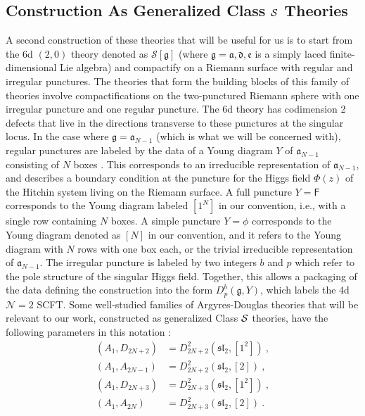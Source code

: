 \documentclass[a4paper,10pt]{article}
\newcommand{\mr}[1]{\mathsf{#1}}
\newcommand{\tsf}[1]{\textsf{#1}}
\newcommand{\mf}[1]{\mathfrak{#1}}
\def\CS {{\cal S}}
\begin{document}
\subsection{Construction As Generalized Class $\CS$ Theories}
A second construction of these theories that will be useful for us is to start from the 6d $(2,0)$ theory denoted as $\mathcal{S}[\mf{g}]$ (where $\mf{g}=\mf{a,d,e}$ is a simply laced finite-dimensional Lie algebra) and compactify on a Riemann surface with regular and irregular punctures. The theories that form the building blocks of this family of theories involve compactifications on the two-punctured Riemann sphere with one irregular puncture and one regular puncture. The 6d theory has codimension 2 defects that live in the directions transverse to these punctures at the singular locus. In the case where $\mf{g}=\mf{a}_{N-1}$ (which is what we will be concerned with), regular punctures are labeled by the data of a Young diagram $Y$ of $\mf{a}_{N-1}$ consisting of $N$ boxes \cite{Gaiotto:2009we,Chacaltana:2010ks,Tachikawa:2013kta,LeFloch:2020uop}. This corresponds to an irreducible representation of $\mf{a}_{N-1}$, and describes a boundary condition at the puncture for the Higgs field $\Phi(z)$ of the Hitchin system living on the Riemann surface. A full puncture $Y=\mr{F}$ corresponds to the Young diagram labeled $[1^N]$ in our convention, i.e., with a single row containing $N$ boxes. A simple puncture $Y=\phi$ corresponds to the Young diagram denoted as $[N]$ in our convention, and it refers to the Young diagram with $N$ rows with one box each, or the trivial irreducible representation of $\mf{a}_{N-1}$. The irregular puncture is labeled by two integers $b$ and $p$ which refer to the pole structure of the singular Higgs field. Together, this allows a packaging of the data defining the construction into the form $D_p^b(\mf{g},Y)$, which labels the 4d $\mathcal{N}=2$ \tsf{SCFT}. Some well-studied families of Argyres-Douglas theories that will be relevant to our work, constructed as generalized Class $\CS$ theories, have the following parameters in this notation \cite{Beem:2023ofp}:
\begin{equation}
    \begin{split}
        (A_1,D_{2N+2})&=D_{2N+2}^2(\mf{sl}_2,[1^2])~, \\
        (A_1,A_{2N-1})&=D_{2N+2}^2(\mf{sl}_2,[2])~, \\
        (A_1,D_{2N+3})&=D_{2N+3}^2(\mf{sl}_2,[1^2])~, \\
        (A_1,A_{2N})&=D_{2N+3}^2(\mf{sl}_2,[2])~. \\
    \end{split}
\end{equation}
\end{document}
